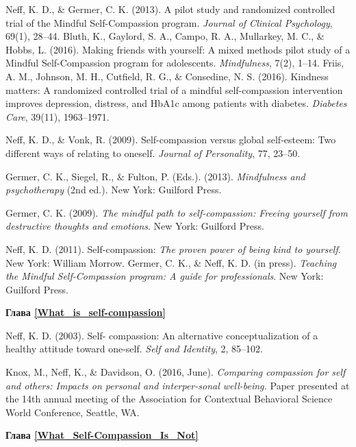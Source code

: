 \begin{thebibliography}{999}
	 Neff, K. D., \& Germer, C. K. (2013). A pilot study and randomized controlled trial of the Mindful Self-Compassion program. \textit{Journal of Clinical Psychology}, 69(1), 28–44.
	 Bluth, K., Gaylord, S. A., Campo, R. A., Mullarkey, M. C., \& Hobbs, L. (2016). Making friends with yourself: A mixed methods pilot study of a Mindful Self-Compassion program for adolescents. \textit{Mindfulness}, 7(2), 1–14.
	 Friis, A. M., Johnson, M. H., Cutfield, R. G., \& Consedine, N. S. (2016). Kindness matters: A randomized controlled trial of a mindful self-compassion intervention improves depression, distress, and HbA1c among patients with diabetes. \textit{Diabetes Care}, 39(11), 1963–1971.
	
	 Neff, K. D., \& Vonk, R. (2009). Self-compassion versus global self-esteem: Two different ways of relating to oneself. \textit{Journal of Personality}, 77, 23–50.
	
	 Germer, C. K., Siegel, R., \& Fulton, P. (Eds.). (2013). \textit{Mindfulness and psychotherapy} (2nd ed.). New York: Guilford Press.
	
	 Germer, C. K. (2009). \textit{The mindful path to self-compassion: Freeing yourself from destructive thoughts and emotions}. New York: Guilford Press.
	
	 Neff, K. D. (2011). Self-compassion: \textit{The proven power of being kind to yourself}. New York: William Morrow.
	 Germer, C. K., \& Neff, K. D. (in press). \textit{Teaching the Mindful Self-Compassion program: A guide for professionals}. New York: Guilford Press.
	
	
	\vspace{3ex}
	\textbf{Глава \ref{What_is_self-compassion}}
	
	 Neff, K. D. (2003). Self- compassion: An alternative conceptualization of a healthy attitude toward one-self. \textit{Self and Identity}, 2, 85–102.
	
	 Knox, M., Neff, K., \& Davidson, O. (2016, June). \textit{Comparing compassion for self and others: Impacts on personal and interper-sonal well-being.} Paper presented at the 14th annual meeting of the Association for Contextual Behavioral Science World Conference, Seattle, WA.
	
	
	\vspace{3ex}
	\textbf{Глава \ref{What_Self-Compassion_Is_Not}}
	

\end{thebibliography}
